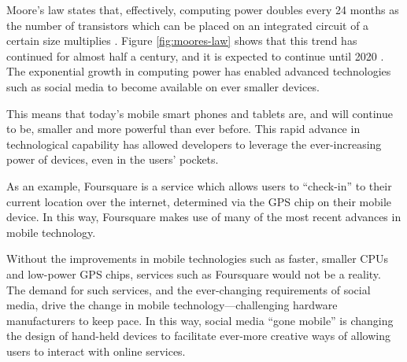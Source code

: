 \documentclass[a4paper,11pt]{article}
\begin{document}
    Moore's law states that, effectively, computing power doubles every 24
    months as the number of transistors which can be placed on an integrated
    circuit of a certain size multiplies \cite{schaller1997}. Figure
    \ref{fig:moores-law} shows that this trend has continued for almost half
    a century, and it is expected to continue until 2020 \cite{kanellos2005}.
    The exponential growth in computing power has enabled advanced technologies
    such as social media to become available on ever smaller devices.

    This means that today's mobile smart phones and tablets are, and will
    continue to be, smaller and more powerful than ever before. This rapid
    advance in technological capability has allowed developers to leverage the
    ever-increasing power of devices, even in the users' pockets.

    As an example, Foursquare is a service which allows users to ``check-in''
    to their current location over the internet, determined via the GPS chip on
    their mobile device. In this way, Foursquare makes use of many of the most
    recent advances in mobile technology.
    
    Without the improvements in mobile technologies such as faster, smaller
    CPUs and low-power GPS chips, services such as Foursquare would not be
    a reality. The demand for such services, and the ever-changing requirements
    of social media, drive the change in mobile technology---challenging
    hardware manufacturers to keep pace. In this way, social media ``gone
    mobile'' is changing the design of hand-held devices to facilitate
    ever-more creative ways of allowing users to interact with online services.

    
    
\end{document}
